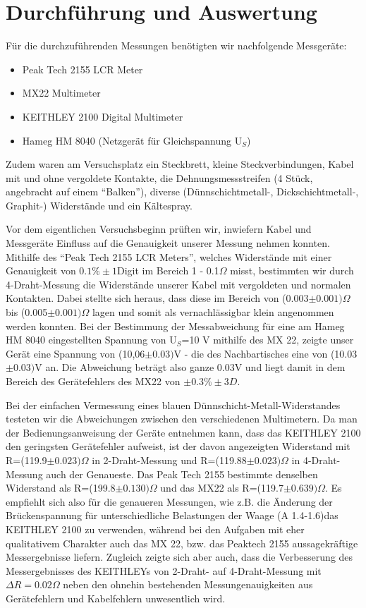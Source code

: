 \documentclass[parskip=half]{report}
\begin{document}
\chapter{Durchführung und Auswertung}
	Für die durchzuführenden Messungen benötigten wir nachfolgende Messgeräte:
		\begin{itemize}
		\item Peak Tech 2155 LCR Meter
		\item MX22 Multimeter
		\item KEITHLEY 2100 Digital Multimeter
		\item Hameg HM 8040 (Netzgerät für Gleichspannung U$_{S}$)
		\end{itemize}
	Zudem waren am Versuchsplatz ein Steckbrett, kleine Steckverbindungen, Kabel mit und ohne vergoldete Kontakte, die Dehnungsmessstreifen (4 Stück, angebracht auf einem "`Balken"'), diverse (Dünnschichtmetall-, Dickschichtmetall-, Graphit-) Widerstände und ein Kältespray. 
	
	Vor dem eigentlichen Versuchsbeginn prüften wir, inwiefern Kabel und Messgeräte Einfluss auf die Genauigkeit unserer Messung nehmen konnten. Mithilfe des "`Peak Tech 2155 LCR Meters"', welches Widerstände mit einer Genauigkeit von $0.1\%\pm1 $Digit im Bereich 1 - 0.1$\Omega$ misst, bestimmten wir durch 4-Draht-Messung die Widerstände unserer Kabel mit vergoldeten und normalen Kontakten. Dabei stellte sich heraus, dass diese im Bereich von (0.003$\pm0.001)\Omega$ bis (0.005$\pm0.001)\Omega$ lagen und somit als vernachlässigbar klein angenommen werden konnten. Bei der Bestimmung der Messabweichung für eine am Hameg HM 8040 eingestellten Spannung von U$_{S}$=10 V mithilfe des MX 22, zeigte unser Gerät eine Spannung von (10,06$\pm0.03)$V - die des Nachbartisches eine von (10.03$\pm0.03)$V an. Die Abweichung beträgt also ganze 0.03V und liegt damit in dem Bereich des Gerätefehlers des MX22 von $\pm0.3\%\pm3D$.
	
Bei der einfachen Vermessung eines blauen Dünnschicht-Metall-Widerstandes testeten wir die Abweichungen zwischen den verschiedenen Multimetern. Da man der Bedienungsanweisung der Geräte entnehmen kann, dass das KEITHLEY 2100 den geringsten Gerätefehler aufweist, ist der davon angezeigten Widerstand mit R=(119.9$\pm 0.023)\Omega$ in 2-Draht-Messung und R=(119.88$\pm 0.023 )\Omega$ in 4-Draht-Messung auch der Genaueste. Das Peak Tech 2155 bestimmte denselben Widerstand als R=(199.8$\pm0.130)\Omega$ und das MX22 als R=(119.7$\pm0.639)\Omega$. Es empfiehlt sich also für die genaueren Messungen, wie z.B. die Änderung der Brückenspannung für unterschiedliche Belastungen der Waage (A 1.4-1.6)das KEITHLEY 2100 zu verwenden, während bei den Aufgaben mit eher qualitativem Charakter auch das MX 22, bzw. das Peaktech 2155 aussagekräftige Messergebnisse liefern. Zugleich zeigte sich aber auch, dass die Verbesserung des Messergebnisses des KEITHLEYs von 2-Draht- auf 4-Draht-Messung mit $\Delta R=0.02\Omega$ neben den ohnehin bestehenden Messungenauigkeiten aus Gerätefehlern und Kabelfehlern unwesentlich wird. 
\end{document}
